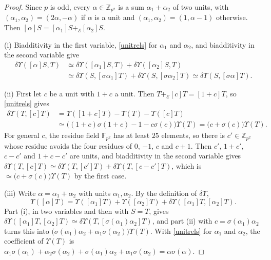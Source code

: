 \begin{proof}
Since $p$ is odd, every $\alpha\in\mathbb Z_{p^2}$ is a sum $\alpha_1+\alpha_2$ of two units, with $(\alpha_1,\alpha_2)=(2\alpha,-\alpha)$ if $\alpha$ is a unit and $(\alpha_1,\alpha_2)=(1,\alpha-1)$ otherwise. Then $[\alpha]S=[\alpha_1]S+_{\mathcal E}[\alpha_2]S$.

(i) Biadditivity in the first variable, \eqref{unitrels} for $\alpha_1$ and $\alpha_2$, and biadditivity in the second variable give
\begin{align*}
\delta\Upsilon([\alpha]S,T)&\simeq\delta\Upsilon([\alpha_1]S,T)+\delta\Upsilon([\alpha_2]S,T)\\
&\simeq\delta\Upsilon(S,[\sigma\alpha_1]T)+\delta\Upsilon(S,[\sigma\alpha_2]T)\simeq\delta\Upsilon(S,[\sigma\alpha]T).
\end{align*}

(ii) First let $c$ be a unit with $1+c$ a unit. Then $T+_{\mathcal E}[c]T=[1+c]T$, so \eqref{unitrels} gives
\begin{align*}
\delta\Upsilon(T,[c]T)&=\Upsilon([1+c]T)-\Upsilon(T)-\Upsilon([c]T)\\
&\simeq\big((1+c)\sigma(1+c)-1-c\sigma(c)\big)\Upsilon(T)=\big(c+\sigma(c)\big)\Upsilon(T).
\end{align*}
For general $c$, the residue field $\mathbb F_{p^2}$ has at least $25$ elements, so there is $c'\in\mathbb Z_{p^2}$ whose residue avoids the four residues of $0$, $-1$, $c$ and $c+1$. Then $c'$, $1+c'$, $c-c'$ and $1+c-c'$ are units, and biadditivity in the second variable gives $\delta\Upsilon(T,[c]T)\simeq\delta\Upsilon(T,[c']T)+\delta\Upsilon(T,[c-c']T)$, which is $\simeq\big(c+\sigma(c)\big)\Upsilon(T)$ by the first case.

(iii) Write $\alpha=\alpha_1+\alpha_2$ with units $\alpha_1,\alpha_2$. By the definition of $\delta\Upsilon$,
\[
\Upsilon([\alpha]T)=\Upsilon([\alpha_1]T)+\Upsilon([\alpha_2]T)+\delta\Upsilon([\alpha_1]T,[\alpha_2]T).
\]
Part (i), in two variables and then with $S=T$, gives $\delta\Upsilon([\alpha_1]T,[\alpha_2]T)\simeq\delta\Upsilon(T,[\sigma(\alpha_1)\alpha_2]T)$, and part (ii) with $c=\sigma(\alpha_1)\alpha_2$ turns this into $\big(\sigma(\alpha_1)\alpha_2+\alpha_1\sigma(\alpha_2)\big)\Upsilon(T)$. With \eqref{unitrels} for $\alpha_1$ and $\alpha_2$, the coefficient of $\Upsilon(T)$ is $\alpha_1\sigma(\alpha_1)+\alpha_2\sigma(\alpha_2)+\sigma(\alpha_1)\alpha_2+\alpha_1\sigma(\alpha_2)=\alpha\sigma(\alpha)$.
\end{proof}

